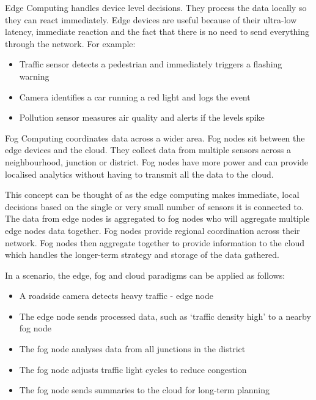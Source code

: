 Edge Computing handles device level decisions. They process the data locally so they can react immediately. Edge devices are useful because of their ultra-low latency, immediate reaction and the fact that there is no need to send everything through the network. For example:
\begin{itemize}
    \item Traffic sensor detects a pedestrian and immediately triggers a flashing warning
    \item Camera identifies a car running a red light and logs the event
    \item Pollution sensor measures air quality and alerts if the levels spike
\end{itemize}

Fog Computing coordinates data across a wider area. Fog nodes sit between the edge devices and the cloud. They collect data from multiple sensors across a neighbourhood, junction or district. Fog nodes have more power and can provide localised analytics without having to transmit all the data to the cloud. 

This concept can be thought of as the edge computing makes immediate, local decisions based on the single or very small number of sensors it is connected to. The data from edge nodes is aggregated to fog nodes who will aggregate multiple edge nodes data together. Fog nodes provide regional coordination across their network. Fog nodes then aggregate together to provide information to the cloud which handles the longer-term strategy and storage of the data gathered. 

In a scenario, the edge, fog and cloud paradigms can be applied as follows:
\begin{itemize}
    \item A roadside camera detects heavy traffic - edge node
    \item The edge node sends processed data, such as `traffic density high' to a nearby fog node
    \item The fog node analyses data from all junctions in the district
    \item The fog node adjusts traffic light cycles to reduce congestion
    \item The fog node sends summaries to the cloud for long-term planning
\end{itemize}

